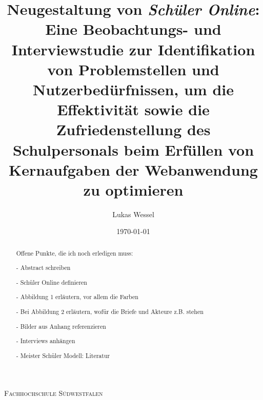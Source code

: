 \documentclass[pdftex,a4paper,abstracton,11pt,parskip=half,bibtotocnumbered]{scrartcl}
\title{Neugestaltung von \textit{Schüler Online}: Eine Beobachtungs- und Interviewstudie zur Identifikation von Problemstellen und Nutzerbedürfnissen, um die Effektivität sowie die Zufriedenstellung des Schulpersonals beim Erfüllen von Kernaufgaben der Webanwendung zu optimieren}
\author{Lukas Wessel}
\date{\today}
\begin{document}

\makeatletter
\begin{titlepage}
	\centering
	{\scshape\LARGE Fachhochschule Südwestfalen \par}
	\vspace{1cm}
	\vspace{1.5cm}
	{\huge\bfseries \@title\par}
	\vspace{3cm}
	{\Large \@author\par}
	\vspace{1cm}
	{\Large \@date\par}
	\vfill

	\raggedright
\end{titlepage}
\makeatother

\thispagestyle{empty}
\begin{abstract}
Offene Punkte, die ich noch erledigen muss:

- Abstract schreiben

- Schüler Online definieren

- Abbildung 1 erläutern, vor allem die Farben

- Bei Abbildung 2 erläutern, wofür die Briefe und Akteure z.B. stehen

- Bilder aus Anhang referenzieren

- Interviews anhängen

- Meister Schüler Modell: Literatur

\end{abstract}

\vfill
\tableofcontents
\pagebreak

\pagebreak

\setcounter{page}{1}








%

\printbibliography
\end{document}
